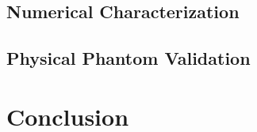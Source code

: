 		\FloatBarrier
		\subsection{Numerical Characterization}

		\FloatBarrier
		\subsection{Physical Phantom Validation}

	\section{Conclusion}

